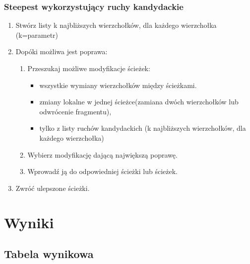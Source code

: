 \documentclass[11pt]{article}
\begin{document}
\subsubsection{Steepest wykorzystujący ruchy kandydackie}

\begin{enumerate}
  \item Stwórz listy k najbliższych wierzchołków, dla każdego wierzchołka (k=parametr)
  \item Dopóki możliwa jest poprawa:
  \begin{enumerate}
    \item Przeszukaj możliwe modyfikacje ścieżek:
    \begin{itemize}
      \item wszystkie wymiany wierzchołków między ścieżkami.
      \item zmiany lokalne w jednej ścieżce(zamiana dwóch wierzchołków lub odwrócenie fragmentu),
      \item tylko z listy ruchów kandydackich (k najbliższych wierzchołków, dla każdego wierzchołka)
    \end{itemize}
    \item Wybierz modyfikację dającą największą poprawę.
    \item Wprowadź ją do odpowiedniej ścieżki lub ścieżek.
  \end{enumerate}
  \item Zwróć ulepszone ścieżki.
\end{enumerate}

\section{Wyniki}\label{sec:wyniki}

\subsection{Tabela wynikowa}\label{subsec:tabela-wynikowa}

\begin{table}[ht]
\centering
{}
\caption{Wyniki dla \texttt{kroA200}}
\end{table}
\end{document}
